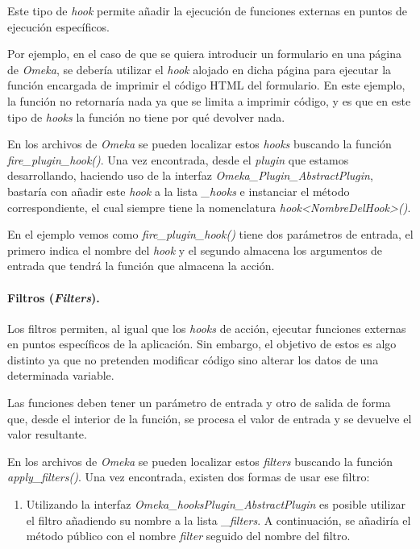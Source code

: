 Este tipo de \emph{hook} permite añadir la ejecución de funciones externas en
puntos de ejecución específicos.

Por ejemplo, en el caso de que se quiera introducir un formulario en una
página de \emph{Omeka}, se debería utilizar el \emph{hook}
alojado en dicha página para ejecutar la función encargada de imprimir
el código HTML del formulario. En este ejemplo, la función no retornaría
nada ya que se limita a imprimir código, y es que en este tipo de
\emph{hooks} la función no tiene por qué devolver nada.

En los archivos de \emph{Omeka} se pueden localizar estos \emph{hooks} buscando
la función \emph{fire\_plugin\_hook()}. Una vez encontrada, desde el
\emph{plugin} que estamos desarrollando, haciendo uso de la interfaz
\emph{Omeka\_Plugin\_AbstractPlugin}, bastaría con añadir este
\emph{hook} a la lista \emph{\_hooks} e instanciar el método
correspondiente, el cual siempre tiene la nomenclatura
\emph{hook\textless NombreDelHook\textgreater()}.


En el ejemplo vemos como \emph{fire\_plugin\_hook()} tiene dos
parámetros de entrada, el primero indica el nombre del \emph{hook} y el
segundo almacena los argumentos de entrada que tendrá la función que
almacena la acción.

\paragraph{Filtros (\emph{Filters}).}

Los filtros permiten, al igual que los \emph{hooks} de acción, ejecutar
funciones externas en puntos específicos de la aplicación. Sin embargo,
el objetivo de estos es algo distinto ya que no pretenden modificar
código sino alterar los datos de una determinada variable.

Las funciones deben tener un parámetro de entrada y otro de
salida de forma que, desde el interior de la función, se procesa el
valor de entrada y se devuelve el valor resultante.

En los archivos de \emph{Omeka} se pueden localizar estos \emph{filters}
buscando la función \emph{apply\_filters()}. Una vez encontrada, existen
dos formas de usar ese filtro:

\begin{enumerate}
\def\labelenumi{\arabic{enumi}.}
\tightlist
\item
  Utilizando la interfaz \emph{Omeka\_hooksPlugin\_AbstractPlugin} es posible
  utilizar el filtro añadiendo su nombre a la lista \emph{\_filters}. A
  continuación, se añadiría el método público con el nombre
  \emph{filter} seguido del nombre del filtro.
\end{enumerate}

